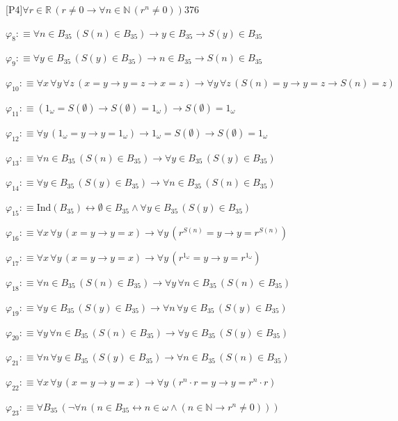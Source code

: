 \begin{fullproof}{[P4]}{$\forall r \in \mathbb{R}\,(r \neq 0 \to \forall n \in \mathbb{N}\,({{r}^{n}} \neq 0))$}{376}
\begin{abbrevlist}
\item $\varphi_{8} :\equiv \forall n \in B_{35}\,(S(n) \in B_{35}) \to y \in B_{35} \to S(y) \in B_{35}$
\item $\varphi_{9} :\equiv \forall y \in B_{35}\,(S(y) \in B_{35}) \to n \in B_{35} \to S(n) \in B_{35}$
\item $\varphi_{10} :\equiv \forall x\,\forall y\,\forall z\,(x = y \to y = z \to x = z) \to \forall y\,\forall z\,(S(n) = y \to y = z \to S(n) = z)$
\item $\varphi_{11} :\equiv (1_{\omega} = S(\emptyset) \to S(\emptyset) = 1_{\omega}) \to S(\emptyset) = 1_{\omega}$
\item $\varphi_{12} :\equiv \forall y\,(1_{\omega} = y \to y = 1_{\omega}) \to 1_{\omega} = S(\emptyset) \to S(\emptyset) = 1_{\omega}$
\item $\varphi_{13} :\equiv \forall n \in B_{35}\,(S(n) \in B_{35}) \to \forall y \in B_{35}\,(S(y) \in B_{35})$
\item $\varphi_{14} :\equiv \forall y \in B_{35}\,(S(y) \in B_{35}) \to \forall n \in B_{35}\,(S(n) \in B_{35})$
\item $\varphi_{15} :\equiv \mathrm{Ind}(B_{35}) \leftrightarrow \emptyset \in B_{35} \land \forall y \in B_{35}\,(S(y) \in B_{35})$
\item $\varphi_{16} :\equiv \forall x\,\forall y\,(x = y \to y = x) \to \forall y\,({{r}^{S(n)}} = y \to y = {{r}^{S(n)}})$
\item $\varphi_{17} :\equiv \forall x\,\forall y\,(x = y \to y = x) \to \forall y\,({{r}^{1_{\omega}}} = y \to y = {{r}^{1_{\omega}}})$
\item $\varphi_{18} :\equiv \forall n \in B_{35}\,(S(n) \in B_{35}) \to \forall y\,\forall n \in B_{35}\,(S(n) \in B_{35})$
\item $\varphi_{19} :\equiv \forall y \in B_{35}\,(S(y) \in B_{35}) \to \forall n\,\forall y \in B_{35}\,(S(y) \in B_{35})$
\item $\varphi_{20} :\equiv \forall y\,\forall n \in B_{35}\,(S(n) \in B_{35}) \to \forall y \in B_{35}\,(S(y) \in B_{35})$
\item $\varphi_{21} :\equiv \forall n\,\forall y \in B_{35}\,(S(y) \in B_{35}) \to \forall n \in B_{35}\,(S(n) \in B_{35})$
\item $\varphi_{22} :\equiv \forall x\,\forall y\,(x = y \to y = x) \to \forall y\,({{r}^{n}} \cdot r = y \to y = {{r}^{n}} \cdot r)$
\item $\varphi_{23} :\equiv \forall B_{35}\,(\neg \forall n\,(n \in B_{35} \leftrightarrow n \in \omega \land (n \in \mathbb{N} \to {{r}^{n}} \neq 0)))$

\end{abbrevlist}
\end{fullproof}
